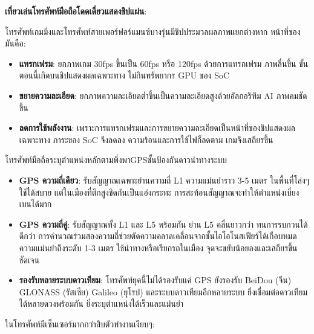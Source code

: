 \textbf{เที่ยวเล่นโทรศัพท์มือถือโดดเดี่ยวแสดงชิปแผ่น}:

โทรศัพท์เกมมิ่งและโทรศัพท์สายเพอร์ฟอร์แมนซ์บางรุ่นมีชิปประมวลผลภาพแยกต่างหาก หน้าที่ของมันคือ:

\begin{itemize}
  \item \textbf{แทรกเฟรม}: ยกภาพเกม 30fps ขึ้นเป็น 60fps หรือ 120fps ด้วยการแทรกเฟรม ภาพลื่นขึ้น ขั้นตอนนี้เกิดบนชิปแสดงผลเฉพาะทาง ไม่กินทรัพยากร GPU ของ SoC
  \item \textbf{ขยายความละเอียด}: ยกภาพความละเอียดต่ำขึ้นเป็นความละเอียดสูงด้วยอัลกอริทึม AI ภาพคมชัดขึ้น
  \item \textbf{ลดการใช้พลังงาน}: เพราะการแทรกเฟรมและการขยายความละเอียดเป็นหน้าที่ของชิปแสดงผลเฉพาะทาง ภาระของ SoC จึงลดลง ความร้อนและการใช้ไฟก็ลดตาม เกมจึงเสถียรขึ้น
\end{itemize}


โทรศัพท์มือถือระบุตำแหน่งหลักตามพึ่งพาGPSชั้นป้องกันดาวนำทางระบบ

\begin{itemize}
  \item \textbf{GPS ความถี่เดียว}: รับสัญญาณเฉพาะย่านความถี่ L1 ความแม่นยำราว 3-5 เมตร ในพื้นที่โล่งๆ ใช้ได้สบาย แต่ในเมืองที่ตึกสูงชิดกันเป็นแอ่งกระทะ การสะท้อนสัญญาณจะทำให้ตำแหน่งเบี่ยงเบนได้มาก
  \item \textbf{GPS ความถี่คู่}: รับสัญญาณทั้ง L1 และ L5 พร้อมกัน ย่าน L5 คลื่นยาวกว่า ทนการรบกวนได้ดีกว่า การคำนวณร่วมสองความถี่ช่วยตัดความคลาดเคลื่อนจากชั้นไอโอโนสเฟียร์ได้เกือบหมด ความแม่นยำถึงระดับ 1-3 เมตร ใช้นำทางหรือเรียกรถในเมือง จุดจะขยับน้อยลงและเสถียรขึ้นชัดเจน
  \item \textbf{รองรับหลายระบบดาวเทียม}: โทรศัพท์ยุคนี้ไม่ได้รองรับแค่ GPS ยังรองรับ BeiDou (จีน) GLONASS (รัสเซีย) Galileo (ยุโรป) และระบบดาวเทียมอีกหลายระบบ ยิ่งเชื่อมต่อดาวเทียมได้หลายดวงพร้อมกัน ยิ่งระบุตำแหน่งได้เร็วและแม่นยำ
\end{itemize}


ในโทรศัพท์มีเซ็นเซอร์มากกว่าสิบตัวทำงานเงียบๆ:

